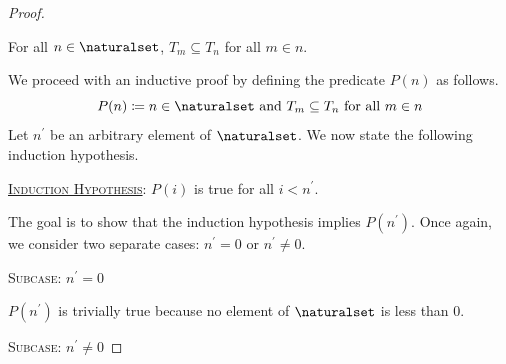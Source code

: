 \begin{proof}
    \begin{claim}
         \label{claim:for-all-m-n-Tm-subset-of-Ts-if-m-less-than-n}
        For all \( n \in \naturalset \), \( T_{m} \subseteq T_{n} \) for all \( m \in n \).
    \end{claim}

    \noindent
    We proceed with an inductive proof by defining the predicate \( P(n) \) as follows.
    \begin{equation*}
        P(n) \coloneq \text{\( n \in \naturalset \) and \( T_{m} \subseteq T_{n} \) for all \( m \in n \)}
    \end{equation*}
    Let \( n^{\prime} \) be an arbitrary element of \( \naturalset \). We now state the following induction hypothesis.

    \vspace{0.3cm}
    \noindent
    \underline{\scshape Induction Hypothesis}: \( P(i) \) is true for all \( i < n^{\prime} \).

    \vspace{0.3cm}
    \noindent
    The goal is to show that the induction hypothesis implies \( P(n^{\prime}) \). Once again, we consider two separate cases: \( n^{\prime} = 0 \)
    or \( n^{\prime} \neq 0 \).

    \vspace{0.3cm}
    \noindent
    {\scshape Subcase}: \( n^{\prime} = 0 \)

    \vspace{0.1cm}
    \noindent
    \( P(n^{\prime}) \) is trivially true because no element of \( \naturalset \) is less than \( 0 \).

    \vspace{0.3cm}
    \noindent
    {\scshape Subcase}: \( n^{\prime} \neq 0 \)


\end{proof}
